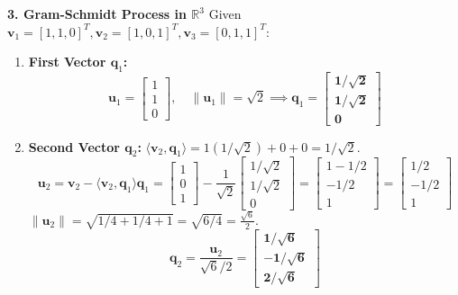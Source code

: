 \textbf{3. Gram-Schmidt Process in $\mathbb{R}^3$}
Given $\mathbf{v}_1 = [1, 1, 0]^T, \mathbf{v}_2 = [1, 0, 1]^T, \mathbf{v}_3 = [0, 1, 1]^T$:
\begin{enumerate}
    \item \textbf{First Vector $\mathbf{q}_1$:}
    \begin{equation*}
    \mathbf{u}_1 = \begin{bmatrix} 1 \\ 1 \\ 0 \end{bmatrix}, \quad \|\mathbf{u}_1\| = \sqrt{2} \implies \mathbf{q}_1 = \mathbf{\begin{bmatrix} 1/\sqrt{2} \\ 1/\sqrt{2} \\ 0 \end{bmatrix}}
    \end{equation*}
    \item \textbf{Second Vector $\mathbf{q}_2$:}
    $\langle \mathbf{v}_2, \mathbf{q}_1 \rangle = 1(1/\sqrt{2}) + 0 + 0 = 1/\sqrt{2}$.
    \begin{equation*}
    \mathbf{u}_2 = \mathbf{v}_2 - \langle \mathbf{v}_2, \mathbf{q}_1 \rangle \mathbf{q}_1 = \begin{bmatrix} 1 \\ 0 \\ 1 \end{bmatrix} - \frac{1}{\sqrt{2}} \begin{bmatrix} 1/\sqrt{2} \\ 1/\sqrt{2} \\ 0 \end{bmatrix} = \begin{bmatrix} 1 - 1/2 \\ -1/2 \\ 1 \end{bmatrix} = \begin{bmatrix} 1/2 \\ -1/2 \\ 1 \end{bmatrix}
    \end{equation*}
    $\|\mathbf{u}_2\| = \sqrt{1/4 + 1/4 + 1} = \sqrt{6/4} = \frac{\sqrt{6}}{2}$.
    \begin{equation*}
    \mathbf{q}_2 = \frac{\mathbf{u}_2}{\sqrt{6}/2} = \mathbf{\begin{bmatrix} 1/\sqrt{6} \\ -1/\sqrt{6} \\ 2/\sqrt{6} \end{bmatrix}}

\end{equation*}
\end{enumerate}
